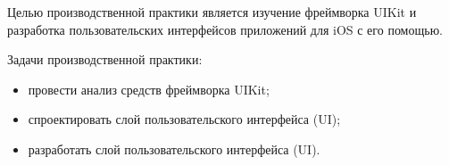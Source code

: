 
Целью производственной практики является изучение фреймворка UIKit и разработка пользовательских интерфейсов приложений для iOS с его помощью.

Задачи производственной практики: 

\begin{itemize}
	\item провести анализ средств фреймворка UIKit;
	\item спроектировать слой пользовательского интерфейса (UI);
	\item разработать слой пользовательского интерфейса (UI).
\end{itemize}

\clearpage

